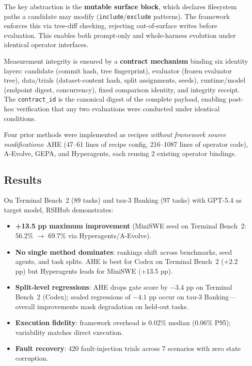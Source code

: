 \documentclass[11pt,a4paper]{article}
\begin{document}
The key abstraction is the \textbf{mutable surface block}, which declares filesystem paths a candidate may modify (\texttt{include}/\texttt{exclude} patterns). The framework enforces this via tree-diff checking, rejecting out-of-surface writes before evaluation. This enables both prompt-only and whole-harness evolution under identical operator interfaces.

Measurement integrity is ensured by a \textbf{contract mechanism} binding six identity layers: candidate (commit hash, tree fingerprint), evaluator (frozen evaluator tree), data/trials (dataset-content hash, split assignments, seeds), runtime/model (endpoint digest, concurrency), fixed comparison identity, and integrity receipt. The \texttt{contract\_id} is the canonical digest of the complete payload, enabling post-hoc verification that any two evaluations were conducted under identical conditions.

Four prior methods were implemented as recipes \emph{without framework source modifications}: AHE (47--61 lines of recipe config, 216--1087 lines of operator code), A-Evolve, GEPA, and Hyperagents, each reusing 2 existing operator bindings.

\subsection{Results}
On Terminal Bench~2 (89 tasks) and tau-3 Banking (97 tasks) with GPT-5.4 as target model, RSIHub demonstrates:

\begin{itemize}
  \item \textbf{+13.5 pp maximum improvement} (MiniSWE seed on Terminal Bench~2: 56.2\% $\to$ 69.7\% via Hyperagents/A-Evolve).
  \item \textbf{No single method dominates}: rankings shift across benchmarks, seed agents, and task splits. AHE is best for Codex on Terminal Bench~2 (+2.2 pp) but Hyperagents leads for MiniSWE (+13.5 pp).
  \item \textbf{Split-level regressions}: AHE drops gate score by $-3.4$ pp on Terminal Bench~2 (Codex); sealed regressions of $-4.1$ pp occur on tau-3 Banking---overall improvements mask degradation on held-out tasks.
  \item \textbf{Execution fidelity}: framework overhead is 0.02\% median (0.06\% P95); variability matches direct execution.
  \item \textbf{Fault recovery}: 420 fault-injection trials across 7 scenarios with zero state corruption.
\end{itemize}
\end{document}
